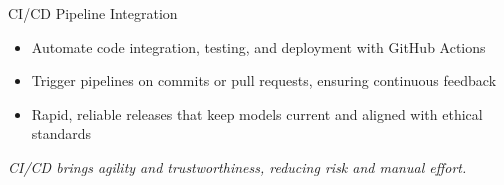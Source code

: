 \documentclass[aspectratio=169]{beamer}
\begin{document}
%
%
\begin{frame}{CI/CD Pipeline Integration}
\begin{itemize}
\item Automate code integration, testing, and deployment with GitHub Actions
\item Trigger pipelines on commits or pull requests, ensuring continuous feedback
\item Rapid, reliable releases that keep models current and aligned with ethical standards
\end{itemize}

\vspace{0.8em}
\emph{CI/CD brings agility and trustworthiness, reducing risk and manual effort.}

\end{frame}
\end{document}
